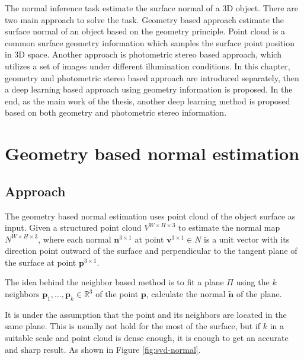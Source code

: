 \documentclass[border=15pt, multi, tikz]{article}
\begin{document}
	
	


The normal inference task estimate the surface normal of a 3D object. There are two main approach to solve the task. Geometry based approach estimate the surface normal of an object based on the geometry principle. Point cloud is a common surface geometry information which samples the surface point position in 3D space. Another approach is photometric stereo based approach, which utilizes a set of images under different illumination conditions. In this chapter, geometry and photometric stereo based approach are introduced separately, then a deep learning based approach using geometry information is proposed. In the end, as the main work of the thesis, another deep learning method is proposed based on both geometry and photometric stereo information.


\section{Geometry based normal estimation}


\subsection{Approach}
The geometry based normal estimation uses point cloud of the object surface as input.
Given a structured point cloud $ V^{W\times H\times 3} $ to estimate the normal map  $ N^{W\times H \times 3} $, where each normal  $ \textbf{n}^{3\times 1} $ at point $ \textbf{v}^{3\times 1} \in N $ is a unit vector with its direction point outward of the surface and perpendicular to the tangent plane of the surface at point $ \textbf{p}^{3\times 1} $.

The idea behind the neighbor based method is to fit a plane $ \Pi $ using the $ k $ neighbors $ \textbf{p}_1, ..., \textbf{p}_k \in \mathbb{R}^3 $ of the point $ \textbf{p} $, calculate the normal  $ \tilde{\textbf{n}} $ of the plane. 

It is under the assumption that the point and its neighbors are located in the same plane. This is usually not hold for the most of the surface, but if $ k $ in a suitable scale and point cloud is dense enough, it is enough to get an accurate and sharp result. As shown in Figure \ref{fig:svd-normal}. 
\end{document}
